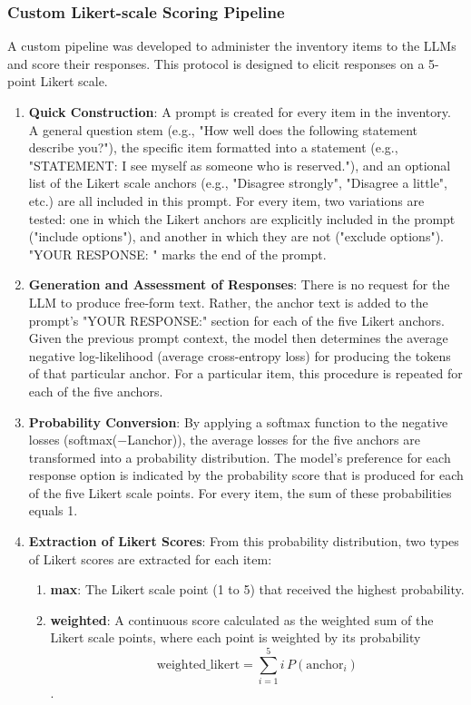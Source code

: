\documentclass{DESSThesis}
\begin{document}
\subsubsection{Custom Likert-scale Scoring Pipeline}
A custom pipeline was developed to administer the inventory items to the LLMs and score their responses. This protocol is designed to elicit responses on a 5-point Likert scale.
\begin{enumerate}
\item \textbf{Quick Construction}: A prompt is created for every item in the inventory. A general question stem (e.g., "How well does the following statement describe you?"), the specific item formatted into a statement (e.g., "STATEMENT: I see myself as someone who is reserved."), and an optional list of the Likert scale anchors (e.g., "Disagree strongly", "Disagree a little", etc.) are all included in this prompt. For every item, two variations are tested: one in which the Likert anchors are explicitly included in the prompt ("include options"), and another in which they are not ("exclude options"). "YOUR RESPONSE: " marks the end of the prompt.
\item \textbf{Generation and Assessment of Responses}: There is no request for the LLM to produce free-form text. Rather, the anchor text is added to the prompt's "YOUR RESPONSE:" section for each of the five Likert anchors. Given the previous prompt context, the model then determines the average negative log-likelihood (average cross-entropy loss) for producing the tokens of that particular anchor. For a particular item, this procedure is repeated for each of the five anchors.
\item \textbf{Probability Conversion}: By applying a softmax function to the negative losses (softmax(−Lanchor)), the average losses for the five anchors are transformed into a probability distribution. The model's preference for each response option is indicated by the probability score that is produced for each of the five Likert scale points. For every item, the sum of these probabilities equals 1.
    \item \textbf{Extraction of Likert Scores}: From this probability distribution, two types of Likert scores are extracted for each item:
\begin{enumerate}
\item \textbf{max}: The Likert scale point (1 to 5) that received the highest probability.
        \item \textbf{weighted}: A continuous score calculated as the weighted sum of the Likert scale points, where each point is weighted by its probability \[\text{weighted\_likert} = \sum_{i=1}^{5} i \, P(\text{anchor}_{i})\].
\end{enumerate}
\end{enumerate}
\end{document}
